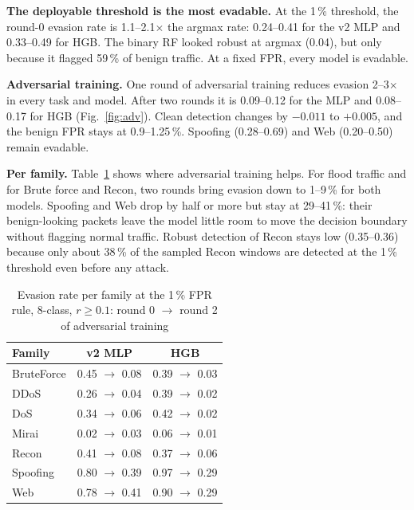 \documentclass[conference]{IEEEtran}
\begin{document}
\textbf{The deployable threshold is the most evadable.} At the 1\,\% threshold, the round-0 evasion rate is 1.1--2.1$\times$ the argmax rate: 0.24--0.41 for the v2 MLP and 0.33--0.49 for HGB. The binary RF looked robust at argmax (0.04), but only because it flagged 59\,\% of benign traffic. At a fixed FPR, every model is evadable.

\textbf{Adversarial training.} One round of adversarial training reduces evasion 2--3$\times$ in every task and model. After two rounds it is 0.09--0.12 for the MLP and 0.08--0.17 for HGB (Fig.~\ref{fig:adv}). Clean detection changes by $-0.011$ to $+0.005$, and the benign FPR stays at 0.9--1.25\,\%. Spoofing (0.28--0.69) and Web (0.20--0.50) remain evadable.

\textbf{Per family.} Table~\ref{tab:advfam} shows where adversarial training helps. For flood traffic and for Brute force and Recon, two rounds bring evasion down to 1--9\,\% for both models. Spoofing and Web drop by half or more but stay at 29--41\,\%: their benign-looking packets leave the model little room to move the decision boundary without flagging normal traffic. Robust detection of Recon stays low (0.35--0.36) because only about 38\,\% of the sampled Recon windows are detected at the 1\,\% threshold even before any attack.

\begin{table}[t]
\caption{Evasion rate per family at the 1\,\% FPR rule, 8-class, $r\ge0.1$: round 0 $\rightarrow$ round 2 of adversarial training}\label{tab:advfam}
\centering\footnotesize
\begin{tabular}{@{}lcc@{}}
\toprule
Family & v2 MLP & HGB \\
\midrule
BruteForce & 0.45 $\rightarrow$ 0.08 & 0.39 $\rightarrow$ 0.03 \\
DDoS & 0.26 $\rightarrow$ 0.04 & 0.39 $\rightarrow$ 0.02 \\
DoS & 0.34 $\rightarrow$ 0.06 & 0.42 $\rightarrow$ 0.02 \\
Mirai & 0.02 $\rightarrow$ 0.03 & 0.06 $\rightarrow$ 0.01 \\
Recon & 0.41 $\rightarrow$ 0.08 & 0.37 $\rightarrow$ 0.06 \\
Spoofing & 0.80 $\rightarrow$ 0.39 & 0.97 $\rightarrow$ 0.29 \\
Web & 0.78 $\rightarrow$ 0.41 & 0.90 $\rightarrow$ 0.29 \\
\bottomrule
\end{tabular}
\end{table}
\end{document}
